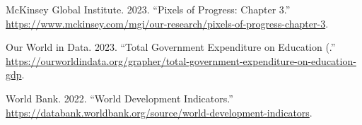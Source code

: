 \documentclass[
]{article}
\newlength{\cslhangindent}
\newenvironment{CSLReferences}[2] %
 {\begin{list}{}{%
  \setlength{\itemindent}{0pt}
  \setlength{\leftmargin}{0pt}
  \setlength{\parsep}{0pt}
  \ifodd #1
   \setlength{\leftmargin}{\cslhangindent}
   \setlength{\itemindent}{-1\cslhangindent}
  \fi
  \setlength{\itemsep}{#2\baselineskip}}}
 {\end{list}}
\begin{document}
\label{refs}
\begin{CSLReferences}{1}{0}
McKinsey Global Institute. 2023. {``Pixels of Progress: Chapter 3.''}
\url{https://www.mckinsey.com/mgi/our-research/pixels-of-progress-chapter-3}.

Our World in Data. 2023. {``Total Government Expenditure on Education
(.''}
\url{https://ourworldindata.org/grapher/total-government-expenditure-on-education-gdp}.

World Bank. 2022. {``World Development Indicators.''}
\url{https://databank.worldbank.org/source/world-development-indicators}.

\end{CSLReferences}
\end{document}
